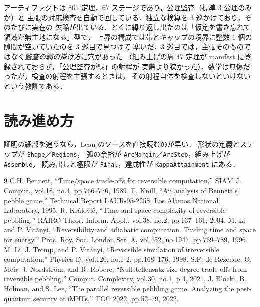 \documentclass[a4paper,11pt]{jsarticle}
\begin{document}
アーティファクトは 861 定理，67 ステージであり，公理監査（標準 3 公理のみか）と
主張の対応検査を自動で回している．独立な検算を 3 巡かけており，そのたびに実在の
欠陥が出ている．とくに繰り返し出たのは「仮定を書き忘れて領域が無主地になる」型で，
上界の構成では帯とキャップの境界に整数 1 個の隙間が空いていたのを 3 巡目で見つけて
塞いだ．3 巡目では，主張そのものではなく\emph{監査の網の掛け方}に穴があった
（組み上げの層 47 定理が manifest に登録されておらず，「公理監査が緑」の射程が
実際より狭かった）．数学は無傷だったが，検査の射程を主張するときは，
その射程自体を検査しないといけないという教訓である．

\section{読み進め方}
証明の細部を追うなら，Lean のソースを直接読むのが早い．
形状の定義とステップが \texttt{Shape}／\texttt{Regions}，
弧の余裕が \texttt{ArcMargin}／\texttt{ArcStep}，組み上げが \texttt{Assemble}，
読み出しと極限が \texttt{Final}，達成性が \texttt{KappaAttainment} にある．

\begin{thebibliography}{9}
 C.H. Bennett, ``Time/space trade-offs for reversible computation,''
SIAM J. Comput., vol.18, no.4, pp.766--776, 1989.
 E. Knill, ``An analysis of Bennett's pebble game,''
Technical Report LAUR-95-2258, Los Alamos National Laboratory, 1995.
 R. Kr\'a\v{l}ovi\v{c}, ``Time and space complexity of reversible pebbling,''
RAIRO Theor. Inform. Appl., vol.38, no.2, pp.137--161, 2004.
 M. Li and P. Vit\'anyi, ``Reversibility and adiabatic computation.
Trading time and space for energy,'' Proc. Roy. Soc. London Ser. A, vol.452,
no.1947, pp.769--789, 1996.
 M. Li, J. Tromp, and P. Vit\'anyi, ``Reversible simulation of
irreversible computation,'' Physica D, vol.120, no.1-2, pp.168--176, 1998.
 S.F. de Rezende, O. Meir, J. Nordstr\"om, and R. Robere,
``Nullstellensatz size-degree trade-offs from reversible pebbling,''
Comput. Complexity, vol.30, no.1, p.4, 2021.
 J. Blocki, B. Holman, and S. Lee, ``The parallel reversible pebbling game.
Analyzing the post-quantum security of iMHFs,'' TCC 2022, pp.52--79, 2022.
\end{thebibliography}
\end{document}
